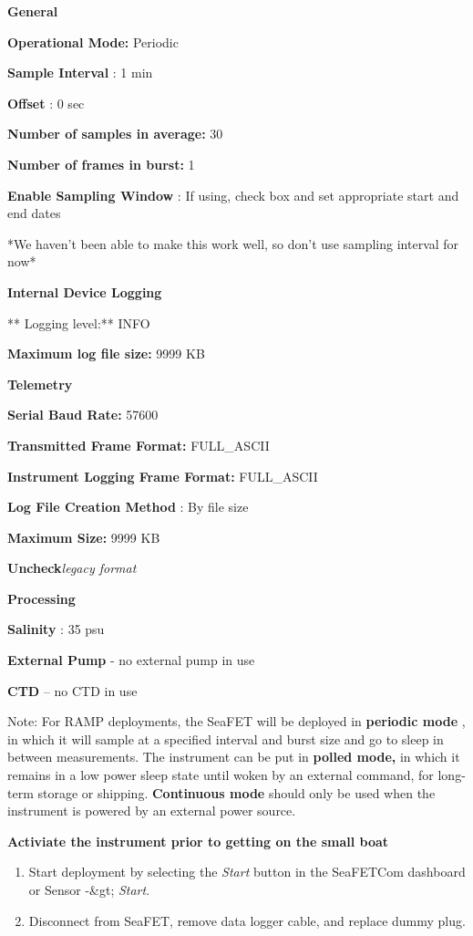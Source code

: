 \documentclass[
]{book}
\providecommand{\tightlist}{%
  \setlength{\itemsep}{0pt}\setlength{\parskip}{0pt}}
\begin{document}
\textbf{General}

\textbf{Operational Mode:} Periodic

\textbf{Sample Interval} : 1 min

\textbf{Offset} : 0 sec

\textbf{Number of samples in average:} 30

\textbf{Number of frames in burst:} 1

\textbf{Enable Sampling Window} : If using, check box and set appropriate start and end dates

*We haven't been able to make this work well, so don't use sampling interval for now*

\textbf{Internal Device Logging}

** Logging level:** INFO

\textbf{Maximum log file size:} 9999 KB

\textbf{Telemetry}

\textbf{Serial Baud Rate:} 57600

\textbf{Transmitted Frame Format:} FULL\_ASCII

\textbf{Instrument Logging Frame Format:} FULL\_ASCII

\textbf{Log File Creation Method} : By file size

\textbf{Maximum Size:} 9999 KB

\textbf{Uncheck}\emph{legacy format}

\textbf{Processing}

\textbf{Salinity} : 35 psu

\textbf{External Pump} - no external pump in use

\textbf{CTD} -- no CTD in use

Note: For RAMP deployments, the SeaFET will be deployed in \textbf{periodic mode} , in which it will sample at a specified interval and burst size and go to sleep in between measurements. The instrument can be put in \textbf{polled mode,} in which it remains in a low power sleep state until woken by an external command, for long-term storage or shipping. \textbf{Continuous mode} should only be used when the instrument is powered by an external power source.

\textbf{Activiate the instrument prior to getting on the small boat}

\begin{enumerate}
\def\labelenumi{\arabic{enumi}.}
\tightlist
\item
  Start deployment by selecting the \emph{Start} button in the SeaFETCom dashboard or Sensor -\&gt; \emph{Start}.
\item
  Disconnect from SeaFET, remove data logger cable, and replace dummy plug.
\end{enumerate}
\end{document}
